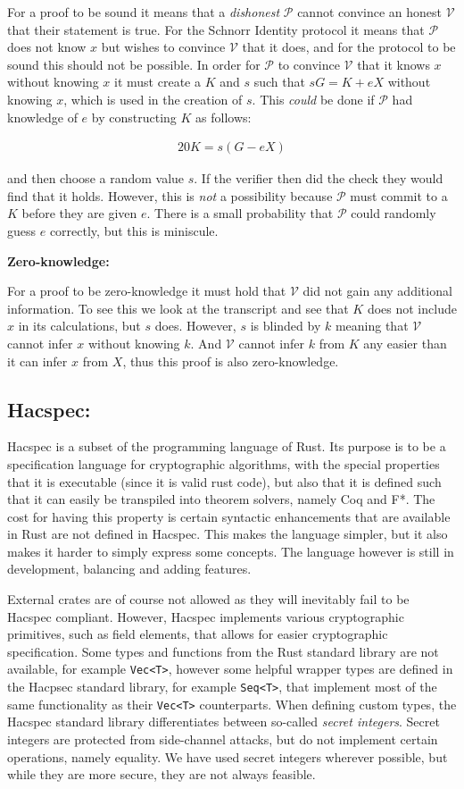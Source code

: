 \documentclass{article}
\newcommand{\eq}[1]{\begin{alignat*}{20}#1\end{alignat*}}
\newcommand{\V}{\mathcal{V}}
\renewcommand{\P}{\mathcal{P}}
\begin{document}
For a proof to be sound it means that a \textit{dishonest} $\P$
cannot convince an honest $\V$ that their statement is true. For the 
Schnorr Identity protocol it means that $\P$ does not know $x$ 
but wishes to convince $\V$ that it does, and for the protocol to be 
sound this should not be possible. In order for $\P$ to convince $\V$ 
that it knows $x$ without knowing $x$ it must create a $K$ and $s$ 
such that $sG = K + eX$ without knowing $x$, which is used in the 
creation of $s$. This \textit{could} be done if $\P$ had knowledge of 
$e$ by constructing $K$ as follows:

\eq{
	K = s(G - eX)
}

and then choose a random value $s$. If the verifier then did the
check they would find that it holds. However, this is \textit{not}
a possibility because $\P$ must commit to a $K$ before they are given
$e$. There is a small probability that $\P$ could randomly guess $e$
correctly, but this is miniscule.

\textbf{Zero-knowledge:}

For a proof to be zero-knowledge it must hold that $\V$ did not gain
any additional information. To see this we look at the transcript
and see that $K$ does not include $x$ in its calculations, but $s$
does. However, $s$ is blinded by $k$ meaning that $\V$ cannot infer $x$
without knowing $k$. And $\V$ cannot infer $k$ from $K$ any easier
than it can infer $x$ from $X$, thus this proof is also zero-knowledge.

\subsection{Hacspec:} \label{hacspec}

Hacspec is a subset of the programming language of Rust. Its purpose is
to be a specification language for cryptographic algorithms, with the
special properties that it is executable (since it is valid rust code),
but also that it is defined such that it can easily be transpiled into
theorem solvers, namely Coq and F*. The cost for having this property
is certain syntactic enhancements that are available in Rust are not
defined in Hacspec. This makes the language simpler, but it also makes
it harder to simply express some concepts. The language however is
still in development, balancing and adding features.

External crates are of course not allowed as they will inevitably
fail to be Hacspec compliant. However, Hacspec implements various
cryptographic primitives, such as field elements, that allows for
easier cryptographic specification. Some types and functions from the
Rust standard library are not available, for example \texttt{Vec<T>},
however some helpful wrapper types are defined in the Hacpsec standard
library, for example \texttt{Seq<T>}, that implement most of the same
functionality as their \texttt{Vec<T>} counterparts. When defining
custom types, the Hacspec standard library differentiates between
so-called \textit{secret integers}. Secret integers are protected
from side-channel attacks, but do not implement certain operations,
namely equality. We have used secret integers wherever possible, but
while they are more secure, they are not always feasible.
\end{document}
